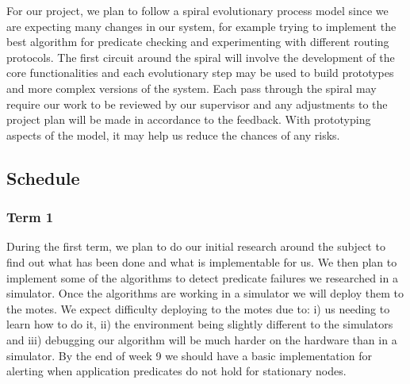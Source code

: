 \documentclass[a4paper]{article}
\begin{document}
For our project, we plan to follow a spiral evolutionary process model since we are expecting many changes in our system, for example trying to implement the best algorithm for predicate checking and experimenting with different routing protocols. The first circuit around the spiral will involve the development of the core functionalities and each evolutionary step may be used to build prototypes and more complex versions of the system. Each pass through the spiral may require our work to be reviewed by our supervisor and any adjustments to the project plan will be made in accordance to the feedback. With prototyping aspects of the model, it may help us reduce the chances of any risks.



\subsection{Schedule}

\subsubsection{Term 1}

During the first term, we plan to do our initial research around the subject to find out what has been done and what is implementable for us. We then plan to implement some of the algorithms to detect predicate failures we researched in a simulator. Once the algorithms are working in a simulator we will deploy them to the motes. We expect difficulty deploying to the motes due to: i) us needing to learn how to do it, ii) the environment being slightly different to the simulators and iii) debugging our algorithm will be much harder on the hardware than in a simulator. By the end of week 9 we should have a basic implementation for alerting when application predicates do not hold for stationary nodes.
\end{document}
